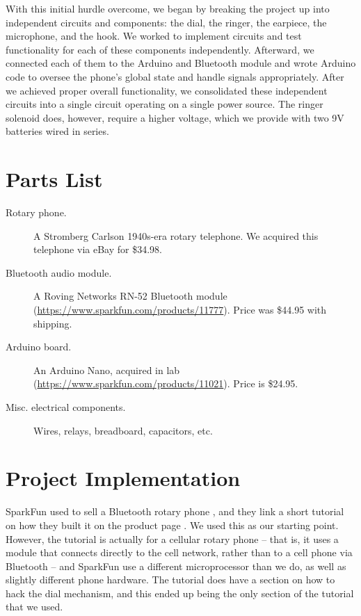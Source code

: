 \documentclass{es50report}
\begin{document}
        With this initial hurdle overcome, we began by breaking the project up into independent circuits and components: the dial, the ringer, the earpiece, the microphone, and the hook. We worked to implement circuits and test functionality for each of these components independently. Afterward, we connected each of them to the Arduino and Bluetooth module and wrote Arduino code to oversee the phone's global state and handle signals appropriately. After we achieved proper overall functionality, we consolidated these independent circuits into a single circuit operating on a single power source. The ringer solenoid does, however, require a higher voltage, which we provide with two 9V batteries wired in series.

    \section{Parts List}
        \begin{description}
            \item[Rotary phone.] A Stromberg Carlson 1940s-era rotary telephone. We acquired this telephone via eBay for \$34.98.
            \item[Bluetooth audio module.] A Roving Networks RN-52 Bluetooth module (\url{https://www.sparkfun.com/products/11777}). Price was \$44.95 with shipping.
            \item[Arduino board.] An Arduino Nano, acquired in lab (\url{https://www.sparkfun.com/products/11021}). Price is \$24.95.
            \item[Misc. electrical components.] Wires, relays, breadboard, capacitors, etc.
        \end{description}

    \section{Project Implementation}
    SparkFun used to sell a Bluetooth rotary phone \cite{sparkfun14}, and they link a short tutorial on how they built it on the product page \cite{seidle05}. We used this as our starting point. However, the tutorial is actually for a cellular rotary phone -- that is, it uses a module that connects directly to the cell network, rather than to a cell phone via Bluetooth -- and SparkFun use a different microprocessor than we do, as well as slightly different phone hardware. The tutorial does have a section on how to hack the dial mechanism, and this ended up being the only section of the tutorial that we used.
\end{document}
